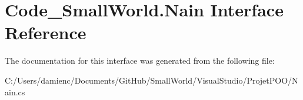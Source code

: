\hypertarget{interface_code___small_world_1_1_nain}{\section{Code\-\_\-\-Small\-World.\-Nain Interface Reference}
\label{interface_code___small_world_1_1_nain}
}


The documentation for this interface was generated from the following file\-:\begin{DoxyCompactItemize}
\item 
C\-:/\-Users/damienc/\-Documents/\-Git\-Hub/\-Small\-World/\-Visual\-Studio/\-Projet\-P\-O\-O/Nain.\-cs\end{DoxyCompactItemize}
